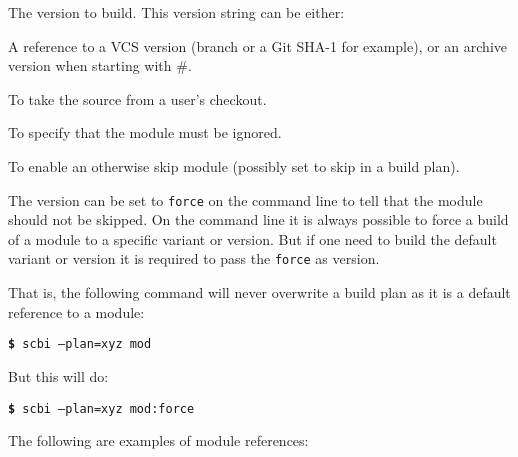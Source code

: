 \documentclass[a4paper,12pt,twoside]{article}
\newcommand{\code}[1]{\texttt{#1}}
\newcommand{\cmd}[1]{\tabto{1cm}\hspace{0.5cm}\texttt{\textbf{\$} #1}}
\begin{document}
\begin{description}[style=nextline]
	\item[version] The version to build. This version string can be either:

	\begin{description}[font=\texttt]
		\item[<ID>] A reference to a VCS version (branch or a Git SHA-1 for example), or an archive version when starting with \#.
		\item[dev] To take the source from a user's checkout.
		\item[skip] To specify that the module must be ignored.
		\item[force] To enable an otherwise skip module (possibly set to skip in a build plan).
	\end{description}

	The version can be set to \code{force} on the command line to tell that the module should not be skipped. On the command line it is always possible to force a build of a module to a specific variant or version. But if one need to build the default variant or version it is required to pass the \code{force} as version.

	That is, the following command will never overwrite a build plan as it is a default reference to a module:

	\cmd{scbi --plan=xyz mod}

	But this will do:

	\cmd{scbi --plan=xyz mod:force}
\end{description}

The following are examples of module references:
\end{document}
